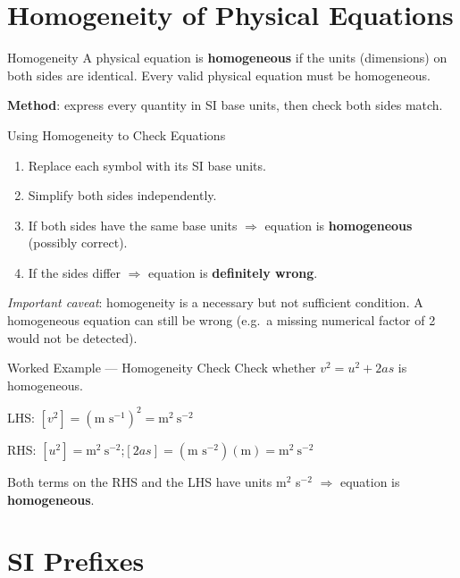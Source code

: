 \pagebreak


\section{Homogeneity of Physical Equations}

\begin{definitionbox}{Homogeneity}
A physical equation is \textbf{homogeneous} if the units (dimensions) on both sides are identical. Every valid physical equation must be homogeneous.

\textbf{Method}: express every quantity in SI base units, then check both sides match.
\end{definitionbox}

\begin{keybox}{Using Homogeneity to Check Equations}
\begin{enumerate}[itemsep=3pt]
  \item Replace each symbol with its SI base units.
  \item Simplify both sides independently.
  \item If both sides have the same base units $\Rightarrow$ equation is \textbf{homogeneous} (possibly correct).
  \item If the sides differ $\Rightarrow$ equation is \textbf{definitely wrong}.
\end{enumerate}
\textit{Important caveat}: homogeneity is a necessary but not sufficient condition. A homogeneous equation can still be wrong (e.g.\ a missing numerical factor of 2 would not be detected).
\end{keybox}

\begin{examplebox}{Worked Example — Homogeneity Check}
Check whether $v^2 = u^2 + 2as$ is homogeneous.

LHS: $[v^2] = (\text{m s}^{-1})^2 = \text{m}^2\ \text{s}^{-2}$

RHS: $[u^2] = \text{m}^2\ \text{s}^{-2}$;\quad $[2as] = (\text{m s}^{-2})(\text{m}) = \text{m}^2\ \text{s}^{-2}$

Both terms on the RHS and the LHS have units m$^2$ s$^{-2}$ $\Rightarrow$ equation is \textbf{homogeneous}. \checkmark
\end{examplebox}

\pagebreak

\section{SI Prefixes}

